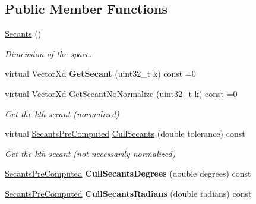 \subsection*{Public Member Functions}
\begin{DoxyCompactItemize}
\item 
\hypertarget{struct_d_r_d_s_p_1_1_secants_a1b22c485c03ef8b5f9181e102f81fddc}{\hyperlink{struct_d_r_d_s_p_1_1_secants_a1b22c485c03ef8b5f9181e102f81fddc}{Secants} ()}\label{struct_d_r_d_s_p_1_1_secants_a1b22c485c03ef8b5f9181e102f81fddc}

\begin{DoxyCompactList}\small\item\em Dimension of the space. \end{DoxyCompactList}\item 
\hypertarget{struct_d_r_d_s_p_1_1_secants_a9fd886acfd2ffd083685f1c3a58db4fc}{virtual Vector\-Xd {\bfseries Get\-Secant} (uint32\-\_\-t k) const =0}\label{struct_d_r_d_s_p_1_1_secants_a9fd886acfd2ffd083685f1c3a58db4fc}

\item 
\hypertarget{struct_d_r_d_s_p_1_1_secants_ac919bfb4875117588b6a2a0c5938b59e}{virtual Vector\-Xd \hyperlink{struct_d_r_d_s_p_1_1_secants_ac919bfb4875117588b6a2a0c5938b59e}{Get\-Secant\-No\-Normalize} (uint32\-\_\-t k) const =0}\label{struct_d_r_d_s_p_1_1_secants_ac919bfb4875117588b6a2a0c5938b59e}

\begin{DoxyCompactList}\small\item\em Get the kth secant (normalized) \end{DoxyCompactList}\item 
\hypertarget{struct_d_r_d_s_p_1_1_secants_a9b6763bc1541a775e842e437448200ef}{virtual \hyperlink{struct_d_r_d_s_p_1_1_secants_pre_computed}{Secants\-Pre\-Computed} \hyperlink{struct_d_r_d_s_p_1_1_secants_a9b6763bc1541a775e842e437448200ef}{Cull\-Secants} (double tolerance) const }\label{struct_d_r_d_s_p_1_1_secants_a9b6763bc1541a775e842e437448200ef}

\begin{DoxyCompactList}\small\item\em Get the kth secant (not necessarily normalized) \end{DoxyCompactList}\item 
\hypertarget{struct_d_r_d_s_p_1_1_secants_abc02bf01e73c2d89848a090c88666291}{\hyperlink{struct_d_r_d_s_p_1_1_secants_pre_computed}{Secants\-Pre\-Computed} {\bfseries Cull\-Secants\-Degrees} (double degrees) const }\label{struct_d_r_d_s_p_1_1_secants_abc02bf01e73c2d89848a090c88666291}

\item 
\hypertarget{struct_d_r_d_s_p_1_1_secants_aec22fc746a9047366d7b81729a2e4f8a}{\hyperlink{struct_d_r_d_s_p_1_1_secants_pre_computed}{Secants\-Pre\-Computed} {\bfseries Cull\-Secants\-Radians} (double radians) const }\label{struct_d_r_d_s_p_1_1_secants_aec22fc746a9047366d7b81729a2e4f8a}

\end{DoxyCompactItemize}
